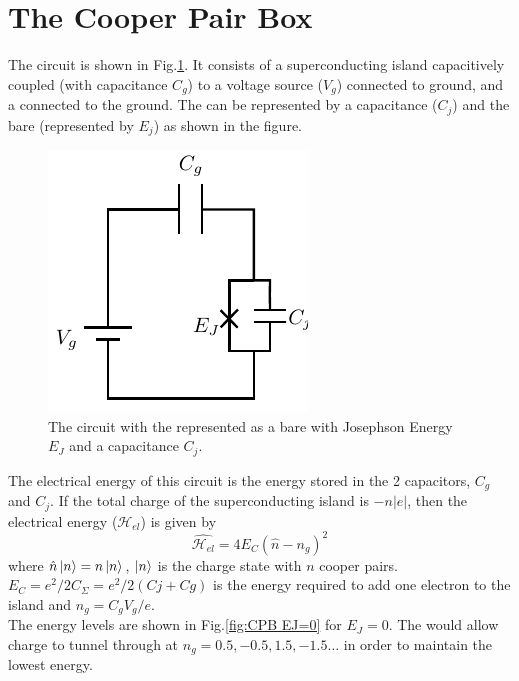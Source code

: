 \section{The Cooper Pair Box}

The \CPB circuit is shown in Fig.\ref{fig:cooperpairbox}. It consists of a superconducting island capacitively coupled (with capacitance $C_g$) to a voltage source ($V_g$) connected to ground, and a \JJ connected to the ground. The \JJ can be represented by a capacitance ($C_j$) and the bare \JJ (represented by $E_j$) as shown in the figure.

\begin{figure}
\centering
\includegraphics{Figures/CPB}
\decoRule
\caption[\CPB circuit]{The \CPB circuit with the \JJ represented as a bare \JJ with Josephson Energy $E_J$ and a capacitance $C_j$.}
\label{fig:cooperpairbox}
\end{figure}

The electrical energy of this circuit is the energy stored in the 2 capacitors, $C_g$ and $C_j$. If the total charge of the superconducting island is $-n|e|$, then the electrical energy ($\mathcal{H}_{el}$) is given by \cite{Schuster2007}
\begin{equation}
\hat{\mathcal{H}_{el}}=4E_C(\hat{n}-n_g)^2
\end{equation}
where $\hat{n}\ket{n}=n\ket{n}$, $\ket{n}$ is the charge state with $n$ cooper pairs.\\
$E_C=e^2/2C_\Sigma=e^2/2(Cj+Cg)$ is the energy required to add one electron to the island and $n_g=C_gV_g/e$.\\
The energy levels are shown in Fig.\ref{fig:CPB EJ=0} for $E_J=0$. The \JJ would allow charge to tunnel through at $n_g=0.5,-0.5,1.5,-1.5\ldots$ in order to maintain the lowest energy.

